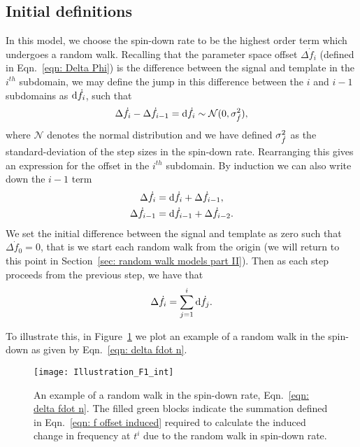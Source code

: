 \documentclass[../full_thesis/full_thesis.tex]{subfiles}
\begin{document}
\subsection{Initial definitions} In this model, we choose the spin-down rate to
be the highest order term which undergoes a random walk. Recalling that the
parameter space offset $\Delta \dot{f}_i$ (defined in Eqn.~\eqref{eqn: Delta
Phi}) is the difference between the signal and template in the $i^{th}$
subdomain, we may define the jump in this difference between the $i$ and $i-1$
subdomains as $\mathrm{d} \dot{f}_i$, such that
\begin{equation}
\Delta \dot{f}_{i} - \Delta\dot{f}_{i-1} = \mathrm{d} \dot{f}_{i} \sim \mathcal{N}(0, \sigma_{\dot{f}}^{2}),
\label{eqn: fdot N}
\end{equation}
where $\mathcal{N}$ denotes the normal distribution and we have defined $\sigma_{\dot{f}}^{2}$
as the standard-deviation of the step sizes in the spin-down rate. Rearranging
this gives an expression for the offset in the
$i^{th}$ subdomain. By induction we can also write down the $i-1$ term
\begin{align}
\Delta\dot{f}_{i} &  = \mathrm{d}\dot{f}_{i} + \Delta\dot{f}_{i-1},  \\
\Delta\dot{f}_{i-1} &  = \mathrm{d}\dot{f}_{i-1} + \Delta\dot{f}_{i-2}  .
\end{align}
We set the initial difference between the signal and template as zero such
that $\Delta\dot{f}_0=0$, that is we start each random walk from the origin
(we will return to this point in Section~\ref{sec: random walk models part
II}). Then as each step proceeds from the previous step, we have that
\begin{equation}
\Delta\dot{f}_{i} = \sum_{j=1}^{i}\mathrm{d}\dot{f}_{j}.
\label{eqn: delta fdot n}
\end{equation}

To illustrate this, in Figure~\ref{fig: Illustration fdot int} we plot an example
of a random walk in the spin-down as given by Eqn.~\eqref{eqn: delta fdot n}.
\begin{figure}[ht]
\centering
\texttt{[image: Illustration\_F1\_int]}
\caption{An example of a random walk in the spin-down rate,
Eqn.~\eqref{eqn: delta fdot n}. The filled green blocks indicate the
summation defined in Eqn.~\eqref{eqn: f offset induced} required to
calculate the induced change in frequency at $t^{i}$ due to the random walk in
spin-down rate.}
\label{fig: Illustration fdot int}
\end{figure}
\end{document}
